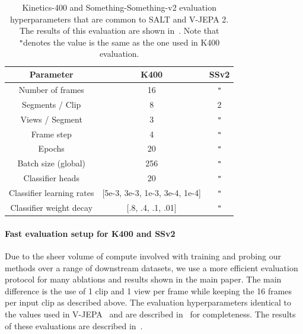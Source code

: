 \documentclass{applemlr}
\numberwithin{equation}{section}
\newcommand{\ourmethod}{SALT\xspace}
\newcommand{\ditto}{\texttt{"}}
\begin{document}
\begin{table}[h]
\centering
\caption{Kinetics-400 and Something-Something-v2 evaluation hyperparameters that are common to \ourmethod and V-JEPA 2. The results of this evaluation are shown in~. Note that \ditto denotes the value is the same as the one used in K400 evaluation.}
\label{tab:appendix:eval:hparams:systematic_k400_ssv2}
\begin{tabular}{ccc}
\toprule
Parameter & K400 & SSv2 \\ 
\midrule
Number of frames & 16 & \ditto \\ 
Segments / Clip & 8 & 2 \\ 
Views / Segment & 3 & \ditto \\ 
Frame step & 4 & \ditto \\ 
Epochs & 20 & \ditto \\ 
Batch size (global) & 256 & \ditto \\ 
Classifier heads & 20 & \ditto  \\ 
Classifier learning rates & [5e-3, 3e-3, 1e-3, 3e-4, 1e-4] & \ditto \\ 
Classifier weight decay & [.8, .4, .1, .01] & \ditto \\ 
\bottomrule
\end{tabular}
\end{table}

\paragraph{Fast evaluation setup for K400 and SSv2} Due to the sheer volume of compute involved with training and probing our methods over a range of downstream datasets, we use a more efficient evaluation protocol for many ablations and results shown in the main paper. The main difference is the use of 1 clip and 1 view per frame while keeping the 16 frames per input clip as described above. The evaluation hyperparameters identical to the values used in V-JEPA~\citep{bardes2024vjepa} and are described in~ for completeness. The results of these evaluations are described in~.
\end{document}
